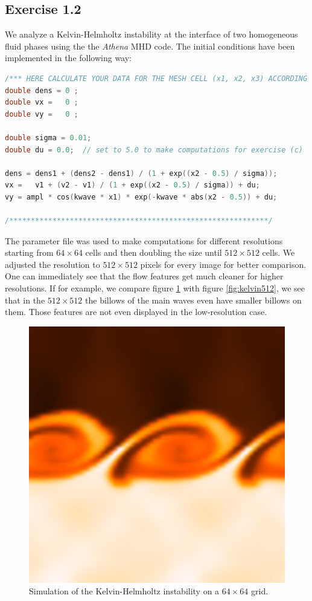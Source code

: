\documentclass{scrartcl}
\begin{document}
\subsection*{Exercise 1.2}

We analyze a Kelvin-Helmholtz instability at the interface of two homogeneous fluid phases using the the \textit{Athena} MHD code.
The initial conditions have been implemented in the following way:

\begin{lstlisting}[title=Changes on the problem generator to implement the given initial conditions. A new variable du was introduced to implement the additional velocity term needed for exercise (c).,  language=C, frame=single]
/*** HERE CALCULATE YOUR DATA FOR THE MESH CELL (x1, x2, x3) ACCORDING TO THE PROBLEM AT HAND*/
double dens = 0 ;
double vx =   0 ;
double vy =   0 ;

double sigma = 0.01;
double du = 0.0;  // set to 5.0 to make computations for exercise (c)

dens = dens1 + (dens2 - dens1) / (1 + exp((x2 - 0.5) / sigma));
vx =   v1 + (v2 - v1) / (1 + exp((x2 - 0.5) / sigma)) + du;
vy = ampl * cos(kwave * x1) * exp(-kwave * abs(x2 - 0.5)) + du;

/************************************************************/
\end{lstlisting}

The parameter file was used to make computations for different resolutions starting from \( 64 \times 64 \) cells and then doubling the size until \( 512 \times 512 \) cells. 
We adjusted the resolution to \( 512 \times 512 \) pixels for every image for better comparison.
One can immediately see that the flow features get much cleaner for higher resolutions. 
If for example, we compare figure \ref{fig:kelvin64resize} with figure \ref{fig:kelvin512}, we see that in the \( 512 \times 512 \) the billows of the main waves even have smaller billows on them.
Those features are not even displayed in the low-resolution case.

\begin{figure}[H]
	\centering
	\includegraphics[width=0.6\linewidth]{../Kelvin64_resize}
	\caption{Simulation of the Kelvin-Helmholtz instability on a \( 64 \times 64 \) grid.}
	\label{fig:kelvin64resize}
\end{figure}
\end{document}
